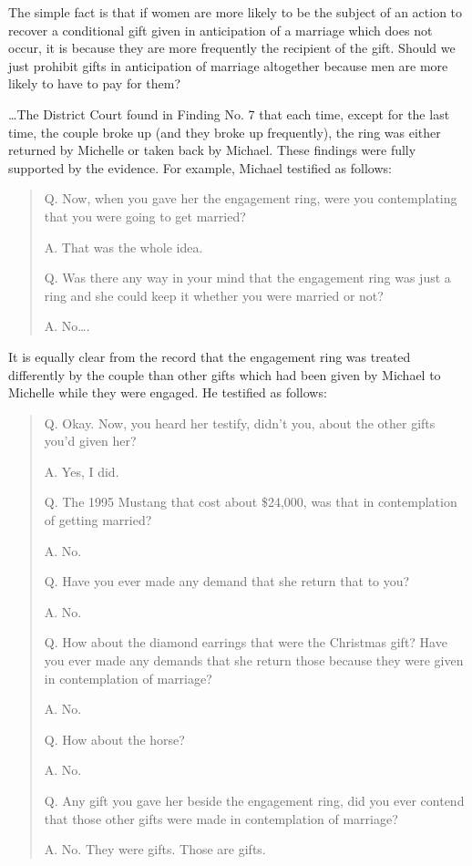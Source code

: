 The simple fact is that if women are more likely to be the subject of an action
to recover a conditional gift given in anticipation of a marriage which does
not occur, it is because they are more frequently the recipient of the gift.
Should we just prohibit gifts in anticipation of marriage altogether because
men are more likely to have to pay for them?

\dots The District Court found in Finding No. 7 that each time, except for the
last time, the couple broke up (and they broke up frequently), the ring was
either returned by Michelle or taken back by Michael. These findings were fully
supported by the evidence. For example, Michael testified as follows:

\begin{quotation}
Q. Now, when you gave her the engagement ring, were you contemplating that you
were going to get married?

A. That was the whole idea.

Q. Was there any way in your mind that the engagement ring was just a ring and
she could keep it whether you were married or not?

A. No\dots{}.
\end{quotation}

It is equally clear from the record that the engagement ring was treated
differently by the couple than other gifts which had been given by Michael to
Michelle while they were engaged. He testified as follows:

\begin{quotation}
Q. Okay. Now, you heard her testify, didn't you, about the other gifts you'd
given her?

A. Yes, I did.

Q. The 1995 Mustang that cost about \$24,000, was that in contemplation of
getting married?

A. No.

Q. Have you ever made any demand that she return that to you?

A. No.

Q. How about the diamond earrings that were the Christmas gift? Have you ever
made any demands that she return those because they were given in contemplation
of marriage?

A. No.

Q. How about the horse?

A. No.

Q. Any gift you gave her beside the engagement ring, did you ever contend that
those other gifts were made in contemplation of marriage?

A. No. They were gifts. Those are gifts.
\end{quotation}

